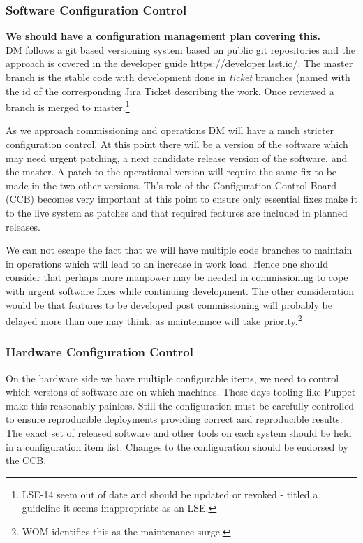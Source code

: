 \subsubsection{Software Configuration Control}
{\bf We should have a configuration management plan covering this.} \\

DM follows a git based versioning system based  on public git repositories and the approach is covered in the developer guide \url{https://developer.lsst.io/}.
The master branch is the stable code with development done in {\em ticket} branches (named with the id of the corresponding Jira Ticket describing the work. Once reviewed a branch is merged to master.\footnote{LSE-14 seem out of date and should be updated or revoked - titled a guideline it seems inappropriate as an LSE.}

As we approach commissioning and operations DM will have a much stricter configuration control. At this point there will be a version of the software which may need urgent patching, a
next candidate release version of the software, and the master. A patch to the operational version
will require the same fix to be made in the two other versions. Th's role of the Configuration Control Board (CCB) becomes very important at this point to ensure only essential fixes make it to the live system as patches and that required features are included in planned releases.


We  can not escape the fact that we  will have multiple code branches to maintain in operations which will lead to an increase in work load.
Hence one should consider that perhaps more manpower may be needed in commissioning to cope with urgent
software fixes while continuing development. The other consideration would be that features to
be developed post commissioning will probably be delayed more than one may think, as maintenance will take priority.\footnote{WOM identifies this as the maintenance surge.}

\subsubsection{Hardware Configuration Control}
On the hardware side we have multiple configurable items, we need to control which versions of software are on which machines. These days tooling like Puppet make this reasonably painless. Still the configuration  must be carefully controlled to ensure reproducible deployments providing correct and reproducible results. The exact set of released software and other tools on each system should be held in a configuration item list. 
Changes to the configuration should be endorsed by the CCB. 


